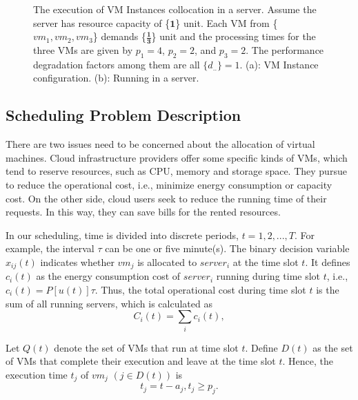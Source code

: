 \documentclass[10pt,journal]{IEEEtran}
\begin{document}
\begin{figure}
\caption{\label{fig:example_degradationFactor}The execution of VM Instances collocation in a server. Assume the server has resource capacity of \{$\bm{1}$\} unit. Each VM from \{$vm_1,vm_2,vm_3$\} demands \{$\bm{\frac{1}{3}}$\} unit and the processing times for the three VMs are given by $p_1=4$, $p_2=2$, and $p_3=2$. The performance degradation factors among them are all $\{d_{..}\}=1$. (a): VM Instance configuration. (b): Running in a server.}
\end{figure}

\subsection{Scheduling Problem Description}

There are two issues need to be concerned about the allocation of virtual machines. Cloud infrastructure providers offer some specific kinds of VMs, which tend to reserve resources, such as CPU, memory and storage space. They pursue to reduce the operational cost, i.e., minimize energy consumption or capacity cost. On the other side, cloud users seek to reduce the running time of their requests. In this way, they can save bills for the rented resources.

In our scheduling, time is divided into discrete periods, $t=1,2,...,T$. For example, the interval $\tau$ can be one or five minute(s). The binary decision variable $x_{ij}(t)$ indicates whether $vm_j$ is allocated to $server_i$ at the time slot $t$. It defines $c_i(t)$ as the energy consumption cost of $server_i$ running during time slot $t$, i.e., $c_i(t)=P[u(t)]\tau$. Thus, the total operational cost during time slot $t$ is the sum of all running servers, which is calculated as
\begin{equation}
C_i(t)=\sum_{i}c_i(t),
\end{equation}

Let $Q(t)$ denote the set of VMs that run at time slot $t$. Define $D(t)$ as the set of VMs that complete their execution and leave at the time slot $t$. Hence, the execution time $t_j$ of $vm_j$ $(j\in{D(t)})$ is
\begin{equation}
t_j=t-a_j, t_j{\geq}p_j.
\end{equation}
\end{document}
